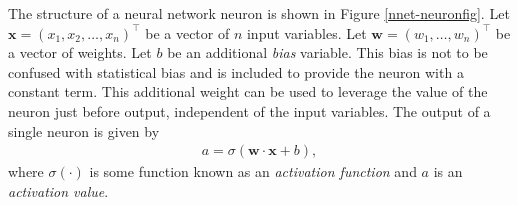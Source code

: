 The structure of a neural network neuron is shown in Figure \ref{nnet-neuronfig}. Let $\mathbf{x} = (x_1, x_2, \ldots, x_n)^\intercal$ be a vector of $n$ input variables. Let $\mathbf{w} = (w_1, \ldots, w_n)^\intercal$ be a vector of weights. Let $b$ be an additional \textit{bias} variable. This bias is not to be confused with statistical bias and is included to provide the neuron with a constant term. This additional weight can be used to leverage the value of the neuron just before output, independent of the input variables. The output of a single neuron is given by
\begin{align}
	a = \sigma(\mathbf{w}\cdot\mathbf{x} + b),
\end{align}
where $\sigma(\cdot)$ is some function known as an \textit{activation function} and $a$ is an \textit{activation value}.



